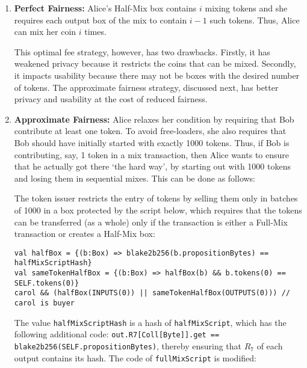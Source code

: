 \documentclass[11pt]{article}
\begin{document}
\begin{enumerate}
	\item \textbf{Perfect Fairness:} 
 Alice's Half-Mix box contains $i$ mixing tokens and she requires each output box of the mix to contain $i-1$ such tokens. Thus, Alice can mix her coin $i$ times. 
 
 This optimal fee strategy, however, has two drawbacks. Firstly, it has weakened privacy because it restricts the coins that can be mixed. Secondly, it impacts usability because there may not be boxes with the desired number of tokens. The approximate fairness strategy, discussed next, has better privacy and usability at the cost of reduced fairness.
 
 \item \textbf{Approximate Fairness:} Alice relaxes her condition by requiring that Bob contribute at least one token. %
 To avoid free-loaders, she also requires that Bob should have initially started with exactly 1000 tokens. Thus, if Bob is contributing, say, 1 token in a mix transaction, then Alice wants to ensure that he actually got there `the hard way', by starting out with 1000 tokens and losing them in sequential mixes. %
This can be done as follows:

The token issuer restricts the entry of tokens by selling them only in batches of 1000 in a box protected by the script below,
which requires that the tokens can be transferred (as a whole) only if the transaction is either a Full-Mix transaction or creates a Half-Mix box: 
\begin{verbatim}
val halfBox = {(b:Box) => blake2b256(b.propositionBytes) == halfMixScriptHash}
val sameTokenHalfBox = {(b:Box) => halfBox(b) && b.tokens(0) == SELF.tokens(0)}
carol && (halfBox(INPUTS(0)) || sameTokenHalfBox(OUTPUTS(0))) // carol is buyer
\end{verbatim}

The value \texttt{halfMixScriptHash} is a hash of \texttt{halfMixScript}, which has the following additional code: 
\texttt{out.R7[Coll[Byte]].get == blake2b256(SELF.propositionBytes)}, thereby ensuring that $R_7$ of each output contains its hash. The code of \texttt{fullMixScript} is modified:


\end{enumerate}
\end{document}
